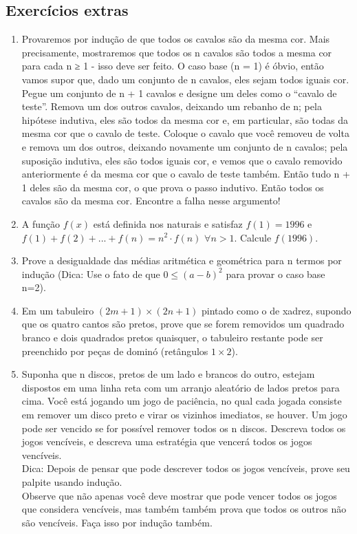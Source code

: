 \subsection{Exercícios extras}
\begin{enumerate}
    \item Provaremos por indução de que todos os cavalos são da mesma cor. Mais precisamente, mostraremos que todos os n cavalos são todos a mesma cor para cada n ≥ 1 - isso deve ser feito. O caso base (n = 1) é óbvio, então vamos supor que, dado um conjunto de n cavalos, eles sejam todos iguais cor. Pegue um conjunto de n + 1 cavalos e designe um deles como o “cavalo de teste”. Remova um dos outros cavalos, deixando um rebanho de n; pela hipótese indutiva, eles são todos da mesma cor e, em particular, são todas da mesma cor que o cavalo de teste. Coloque o cavalo que você removeu de volta e remova um dos outros, deixando novamente um conjunto de n cavalos; pela suposição indutiva, eles são todos iguais cor, e vemos que o cavalo removido anteriormente é da mesma cor que o cavalo de teste também. Então tudo n + 1 deles são da mesma cor, o que prova o passo indutivo. Então todos os cavalos são da mesma cor. Encontre a falha nesse argumento!
    
    \item A função $f(x)$ está definida nos naturais e satisfaz $f(1)=1996$ e $f(1)+f(2)+...+f(n)=n^2 \cdot f(n)$ $\forall n>1$. Calcule $f(1996)$.
    
    \item Prove a desigualdade das médias aritmética e geométrica para n termos por indução (Dica: Use o fato de que $0 \leq (a-b)^2$ para provar o caso base n=2).
    
    \item Em um tabuleiro $(2m+1) \times (2n+1)$ pintado como o de xadrez, supondo que os quatro cantos são pretos, prove que se forem removidos um quadrado branco e dois quadrados pretos quaisquer, o tabuleiro restante pode ser preenchido por peças de dominó (retângulos $1 \times 2$). 
    
    \item Suponha que n discos, pretos de um lado e brancos do outro, estejam dispostos em uma linha reta com um arranjo aleatório de lados pretos para cima. Você está jogando um jogo de paciência, no qual cada jogada
    consiste em remover um disco preto e virar os vizinhos imediatos, se houver. Um jogo pode ser vencido se for possível remover todos os n discos. Descreva todos os jogos vencíveis, e descreva uma estratégia que vencerá todos os jogos vencíveis. \\
    Dica: Depois de pensar que pode descrever todos os jogos vencíveis, prove seu palpite usando indução.\\
    Observe que não apenas você deve mostrar que pode vencer todos os jogos que considera vencíveis, mas também
    também prova que todos os outros não são vencíveis. Faça isso por indução também.
\end{enumerate}

